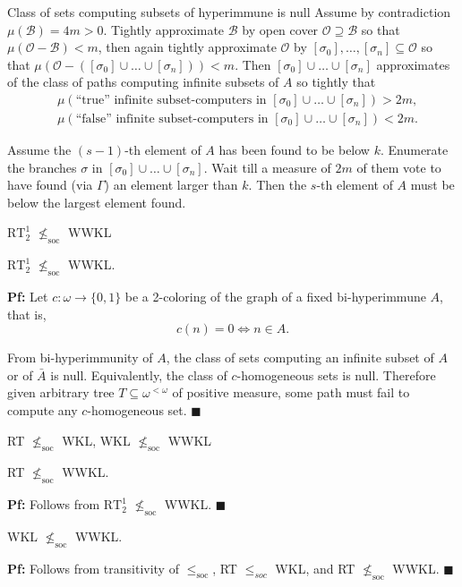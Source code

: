 \begin{frame}{Class of sets computing subsets of hyperimmune is null}
  Assume by contradiction $\mu(\mathcal{B})=4m>0$. Tightly approximate
  $\mathcal{B}$ by open cover $\mathcal{O}\supseteq\mathcal{B}$ so that
  $\mu(\mathcal{O}-\mathcal{B})<m$, then again tightly approximate
  $\mathcal{O}$ by $[\sigma_0],\ldots,[\sigma_n] \subseteq\mathcal{O}$ so
  that $\mu(\mathcal{O}-([\sigma_0]\cup\ldots\cup[\sigma_n])) <m$.
  Then $[\sigma_0]\cup\ldots\cup[\sigma_n]$ approximates of the class
  of paths computing infinite subsets of $A$ so tightly that
  \begin{align*}
    &\mu(\text{``true'' infinite subset-computers in }
    [\sigma_0]\cup\ldots\cup[\sigma_n])>2m,\\
    &\mu(\text{``false'' infinite subset-computers in }
    [\sigma_0]\cup\ldots\cup[\sigma_n])<2m.
  \end{align*}

  Assume the $(s-1)$-th element of $A$ has been found to be below $k$.
  Enumerate the branches $\sigma$ in $[\sigma_0]\cup\ldots\cup[\sigma_n]$.
  Wait till a measure of $2m$ of them vote to have found (via $\Gamma$) an
  element larger than $k$. Then the $s$-th element of $A$ must be below the
  largest element found.
\end{frame}

\begin{frame}{$\text{RT}_2^1$ $\nleq_{\text{soc}}$ WWKL}
  \begin{thm}
    $\text{RT}_2^1$ $\nleq_{\text{soc}}$ WWKL.
  \end{thm}

  \vspace{1em}
  \textbf{Pf:} Let $c:\omega\rightarrow\{0,1\}$ be a 2-coloring of the
  graph of a fixed bi-hyperimmune $A$, that is,
  \[c(n)=0 \Leftrightarrow n\in A.\]
  
  From bi-hyperimmunity of $A$, the class of sets computing an infinite
  subset of $A$ or of $\bar{A}$ is null. Equivalently, the class of
  $c$-homogeneous sets is null. Therefore given arbitrary tree
  $T\subseteq\omega^{<\omega}$ of positive measure, some path must fail to
  compute any $c$-homogeneous set. $\blacksquare$
\end{frame}

\begin{frame}{RT $\nleq_{\text{soc}}$ WKL, WKL $\nleq_{\text{soc}}$ WWKL}
  \begin{coro}
    \label{coro:rt-wwkl}
    RT $\nleq_{\text{soc}}$ WWKL.
  \end{coro}
  \textbf{Pf:} Follows from $\text{RT}_2^1$ $\nleq_{\text{soc}}$ WWKL.
  $\blacksquare$

  \vspace{2em}
  \begin{coro}
    WKL $\nleq_{\text{soc}}$ WWKL.
  \end{coro}
  \textbf{Pf:} Follows from transitivity of $\leq_\text{soc}$,
  RT $\leq_{soc}$ WKL, and RT $\nleq_{\text{soc}}$ WWKL. $\blacksquare$
\end{frame}
